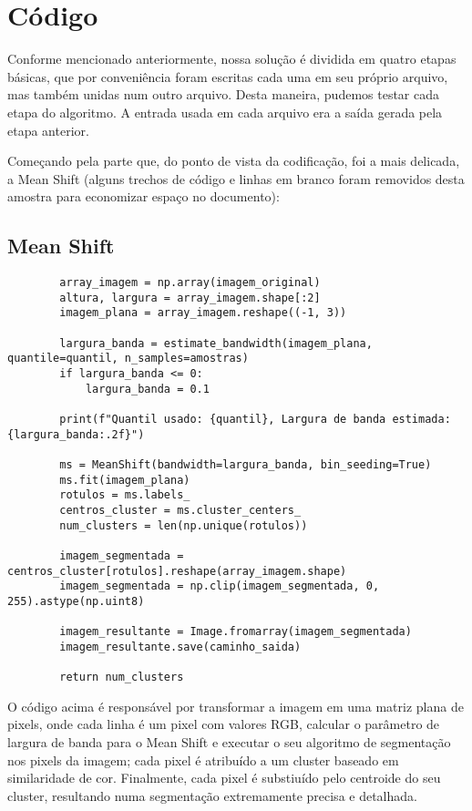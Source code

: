 \documentclass{article}
\begin{document}
\section{Código}

Conforme mencionado anteriormente, nossa solução é dividida em quatro etapas básicas, que por conveniência foram escritas cada uma em seu próprio arquivo, mas também unidas num outro arquivo. Desta maneira, pudemos testar cada etapa do algoritmo. A entrada usada em cada arquivo era a saída gerada pela etapa anterior.

Começando pela parte que, do ponto de vista da codificação, foi a mais delicada, a Mean Shift (alguns trechos de código e linhas em branco foram removidos desta amostra para economizar espaço no documento):

\subsection{Mean Shift}

\begin{verbatim}
        array_imagem = np.array(imagem_original)
        altura, largura = array_imagem.shape[:2]
        imagem_plana = array_imagem.reshape((-1, 3))

        largura_banda = estimate_bandwidth(imagem_plana, quantile=quantil, n_samples=amostras)
        if largura_banda <= 0:
            largura_banda = 0.1

        print(f"Quantil usado: {quantil}, Largura de banda estimada: {largura_banda:.2f}")

        ms = MeanShift(bandwidth=largura_banda, bin_seeding=True)
        ms.fit(imagem_plana)
        rotulos = ms.labels_
        centros_cluster = ms.cluster_centers_
        num_clusters = len(np.unique(rotulos))

        imagem_segmentada = centros_cluster[rotulos].reshape(array_imagem.shape)
        imagem_segmentada = np.clip(imagem_segmentada, 0, 255).astype(np.uint8)

        imagem_resultante = Image.fromarray(imagem_segmentada)
        imagem_resultante.save(caminho_saida)

        return num_clusters
\end{verbatim}

O código acima é responsável por transformar a imagem em uma matriz plana de pixels, onde cada linha é um pixel com valores RGB, calcular o parâmetro de largura de banda para o Mean Shift e executar o seu algoritmo de segmentação nos pixels da imagem; cada pixel é atribuído a um cluster baseado em similaridade de cor. Finalmente, cada pixel é substiuído pelo centroide do seu cluster, resultando numa segmentação extremamente precisa e detalhada.
\end{document}
